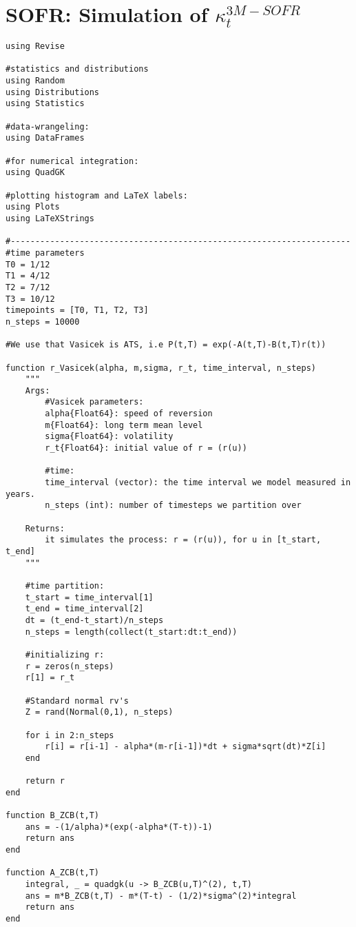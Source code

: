 \newpage 
\section{SOFR: Simulation of $\kappa_{t}^{3M-SOFR}$}
\begin{verbatim}
using Revise

#statistics and distributions
using Random 
using Distributions
using Statistics

#data-wrangeling:
using DataFrames

#for numerical integration:
using QuadGK

#plotting histogram and LaTeX labels:
using Plots 
using LaTeXStrings

#---------------------------------------------------------------------
#time parameters
T0 = 1/12
T1 = 4/12
T2 = 7/12
T3 = 10/12
timepoints = [T0, T1, T2, T3]
n_steps = 10000

#We use that Vasicek is ATS, i.e P(t,T) = exp(-A(t,T)-B(t,T)r(t))

function r_Vasicek(alpha, m,sigma, r_t, time_interval, n_steps)
    """
    Args: 
        #Vasicek parameters:
        alpha{Float64}: speed of reversion 
        m{Float64}: long term mean level 
        sigma{Float64}: volatility 
        r_t{Float64}: initial value of r = (r(u))
        
        #time:
        time_interval (vector): the time interval we model measured in years.
        n_steps (int): number of timesteps we partition over
    
    Returns: 
        it simulates the process: r = (r(u)), for u in [t_start, t_end]
    """

    #time partition: 
    t_start = time_interval[1]
    t_end = time_interval[2]
    dt = (t_end-t_start)/n_steps
    n_steps = length(collect(t_start:dt:t_end))

    #initializing r: 
    r = zeros(n_steps)
    r[1] = r_t

    #Standard normal rv's
    Z = rand(Normal(0,1), n_steps)

    for i in 2:n_steps
        r[i] = r[i-1] - alpha*(m-r[i-1])*dt + sigma*sqrt(dt)*Z[i]
    end

    return r
end

function B_ZCB(t,T)
    ans = -(1/alpha)*(exp(-alpha*(T-t))-1)
    return ans
end

function A_ZCB(t,T)
    integral, _ = quadgk(u -> B_ZCB(u,T)^(2), t,T)
    ans = m*B_ZCB(t,T) - m*(T-t) - (1/2)*sigma^(2)*integral 
    return ans
end


\end{verbatim}
